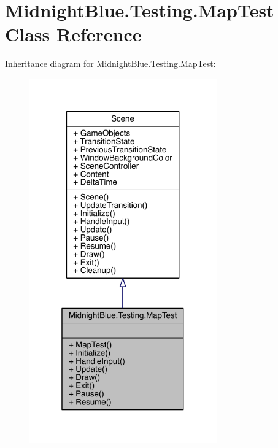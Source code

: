 \hypertarget{class_midnight_blue_1_1_testing_1_1_map_test}{}\section{Midnight\+Blue.\+Testing.\+Map\+Test Class Reference}
\label{class_midnight_blue_1_1_testing_1_1_map_test}


Inheritance diagram for Midnight\+Blue.\+Testing.\+Map\+Test\+:\nopagebreak
\begin{figure}[H]
\begin{center}
\leavevmode
\includegraphics[width=229pt]{class_midnight_blue_1_1_testing_1_1_map_test__inherit__graph}
\end{center}
\end{figure}



